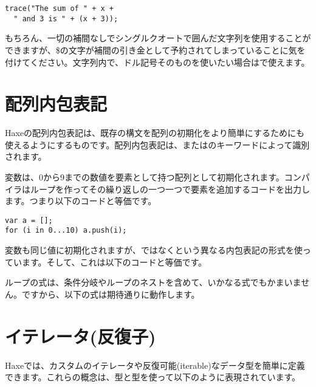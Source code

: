 \begin{lstlisting}
trace("The sum of " + x +
  " and 3 is " + (x + 3));
\end{lstlisting}

もちろん、一切の補間なしでシングルクオートで囲んだ文字列を使用することができますが、\$の文字が補間の引き金として予約されてしまっていることに気を付けてください。文字列内で、ドル記号そのものを使いたい場合は\expr{\$\$}で使えます。


\section{配列内包表記}
\label{lf-array-comprehension}


Haxeの配列内包表記は、既存の構文を配列の初期化をより簡単にするためにも使えるようにするものです。配列内包表記は、またはのキーワードによって識別されます。


変数は、0から9までの数値を要素として持つ配列として初期化されます。コンパイラはループを作ってその繰り返しの一つ一つで要素を追加するコードを出力します。つまり以下のコードと等価です。

\begin{lstlisting}
var a = [];
for (i in 0...10) a.push(i);
\end{lstlisting}

変数も同じ値に初期化されますが、ではなくという異なる内包表記の形式を使っています。そして、これは以下のコードと等価です。

ループの式は、条件分岐やループのネストを含めて、いかなる式でもかまいません。ですから、以下の式は期待通りに動作します。


\section{イテレータ(反復子)}
\label{lf-iterators}

Haxeでは、カスタムのイテレータや反復可能(iterable)なデータ型を簡単に定義できます。これらの概念は、型と型を使って以下のように表現されています。


